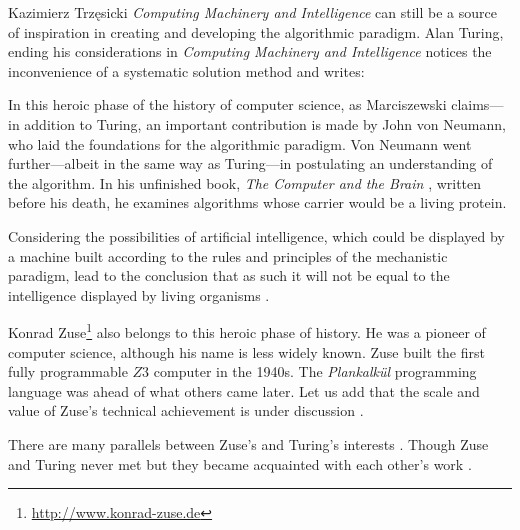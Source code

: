 \begin{artengenv}{Kazimierz Trzęsicki}
\emph{Computing Machinery and Intelligence} \parencite*{Turing1950} can still be a source of inspiration in creating and developing the algorithmic  paradigm. Alan Turing, ending his considerations in \emph{Computing Machinery and Intelligence} \parencite*[p.64]{Turing1950} notices the inconvenience of a systematic solution method and writes: 

In this heroic phase of the history of computer science, as Marciszewski \parencite*[p.165]{MarciszewskiStacewicz2011} claims---in addition to Turing, an important contribution is made by John von Neumann, who laid the foundations for the algorithmic  paradigm. Von Neumann went further---albeit in the same way as Turing---in postulating an understanding of the algorithm. In his unfinished book, \emph{The Computer and the Brain} \parencite*{vonNeumann1958}, written before his death, he examines algorithms whose carrier would be a living protein.

Considering the possibilities of artificial intelligence, which could be displayed by a machine built according to the rules and principles of the mechanistic paradigm, lead to the conclusion that as such it will not be equal to the intelligence displayed by living organisms \parencite{Trzesicki2006slgr}.


 Konrad Zuse\footnote{\url{http://www.konrad-zuse.de}}  also belongs to this heroic phase of history. He was a pioneer of computer science, although his name is less widely known. Zuse built the first fully programmable $Z3$ computer in the 1940s. The \textit{Plankalk{\"u}l} programming language was ahead of what others came later. Let us add that the scale and value of Zuse's technical achievement is under discussion \parencite[p.448]{CopelandSprevakShagrir2017}.

There are many parallels between Zuse's and Turing's interests \parencite[p.58]{Zuse2012a}. Though Zuse and Turing never met but they became acquainted with each other’s
work \parencite[p.60]{German2012}.



\end{artengenv}
